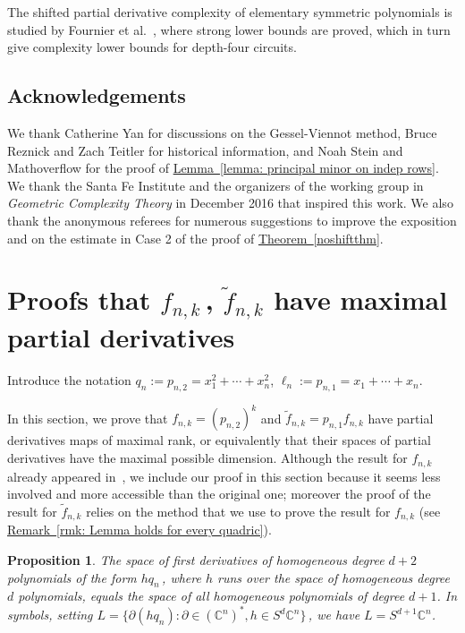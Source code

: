 \documentclass[11pt]{article}
\numberwithin{equation}{section}
\newtheorem{proposition}[theorem]{Proposition}
\theoremstyle{definition}
\theoremstyle{plain}
\newcommand{\expref}[2]{\hyperref[#2]{#1~\ref{#2}}}
\newcommand{\bbC}{\mathbb{C}}
\renewcommand{\tilde}[1]{\widetilde{#1}}
\begin{document}
 The shifted partial derivative complexity of elementary symmetric polynomials is studied by  %
 Fournier et al.~\cite{MR3419496}, where strong lower bounds are proved, which in turn give complexity lower bounds for depth-four circuits.
 
 \subsection*{Acknowledgements} We thank Catherine Yan
%
%
 for discussions on the Gessel-Viennot method, Bruce Reznick and Zach Teitler for historical information, and Noah Stein and Mathoverflow for the proof of \expref{Lemma}{lemma: principal minor on indep rows}. We thank the Santa Fe Institute and the organizers of the working group in \emph{Geometric Complexity Theory} in December 2016 that inspired this work. We also thank the anonymous referees for numerous suggestions to improve the exposition and on the estimate in Case 2 of the proof of \expref{Theorem}{noshiftthm}.



\section{Proofs that \texorpdfstring{$f_{n,k}$\,, $\tilde f_{n,k}$}{f(n,k), tilde f(n,k)} have maximal partial derivatives}\label{easycataproofs}
Introduce the notation $q_n :=p_{n,2} =x_1^2+\cdots + x_n^2$, $\ell_n:= p_{n,1} = x_1 + \cdots + x_n$.

In this section, we prove that $f_{n,k}=(p_{n,2})^k$ and $\tilde{f}_{n,k}=p_{n,1}f_{n,k}$ have partial derivatives maps of maximal rank, or equivalently that their spaces of partial derivatives have the maximal possible dimension. Although the result for $f_{n,k}$ already appeared in~\cite[Thm. 8.15]{MR1096187}, we include our proof in this section because it seems less involved and more accessible than the original one; moreover the proof of the result for $\tilde{f}_{n,k}$ relies on the method that we use to prove the result for $f_{n,k}$ (see \expref{Remark}{rmk: Lemma holds for every quadric}).

 \begin{proposition}\label{prop: hit everything with deg one differentials}
The space of first  derivatives of homogeneous  degree $d+2$ polynomials of the form $h q_n$\,, where $h$ runs over the space of  homogeneous  degree $d$ polynomials,  equals the space of all homogeneous polynomials of degree $d+1$. In symbols, setting $L = \{ \partial ( h q_n  ) : \partial \in (\bbC^n)^*, h \in S^{d} \bbC^n\}$\,, we have $L = S^{d+1} \bbC^n$. 
\end{proposition}
\end{document}

